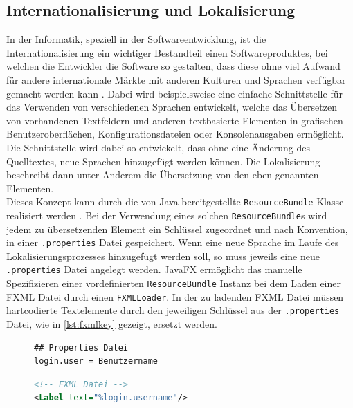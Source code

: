 \subsection{Internationalisierung und Lokalisierung}
In der Informatik, speziell in der Softwareentwicklung, ist die Internationalisierung ein wichtiger Bestandteil einen Softwareproduktes, bei welchen die Entwickler die Software so gestalten, dass diese ohne viel Aufwand für andere internationale Märkte mit anderen Kulturen und Sprachen verfügbar gemacht werden kann \cite{Reineke2005}. Dabei wird beispielsweise eine einfache Schnittstelle für das Verwenden von verschiedenen Sprachen entwickelt, welche das Übersetzen von vorhandenen Textfeldern und anderen textbasierte Elementen in grafischen Benutzeroberflächen, Konfigurationsdateien oder Konsolenausgaben ermöglicht. Die Schnittstelle wird dabei so entwickelt, dass ohne eine Änderung des Quelltextes, neue Sprachen hinzugefügt werden können. Die Lokalisierung beschreibt dann unter Anderem die Übersetzung von den eben genannten Elementen.\\
Dieses Konzept kann durch die von Java bereitgestellte \texttt{ResourceBundle} Klasse realisiert werden \cite{Deitsch2001}. Bei der Verwendung eines solchen \texttt{ResourceBundle}s wird jedem zu übersetzenden Element ein Schlüssel zugeordnet und nach Konvention, in einer \texttt{.properties} Datei gespeichert. Wenn eine neue Sprache im Laufe des Lokalisierungsprozesses hinzugefügt werden soll, so muss jeweils eine neue \texttt{.properties} Datei angelegt werden. JavaFX ermöglicht das manuelle Spezifizieren einer vordefinierten \texttt{ResourceBundle} Instanz bei dem Laden einer FXML Datei durch einen \texttt{FXMLLoader}.
In der zu ladenden FXML Datei müssen hartcodierte Textelemente durch den jeweiligen Schlüssel aus der \texttt{.properties} Datei, wie in \autoref{lst:fxmlkey} gezeigt, ersetzt werden.
\begin{figure}[H]
	\noindent
	\begin{adjustbox}{minipage=[t]{.45\linewidth},gstore totalheight=\heightone,margin=\fboxsep+\fboxrule}
		\begin{lstlisting}
## Properties Datei
login.user = Benutzername
		\end{lstlisting}
	\end{adjustbox}\hfill
	\begin{adjustbox}{minipage=[t][\heightone]{0.5\linewidth}}
		\begin{lstlisting}[language=XML]
<!-- FXML Datei -->
<Label text="%login.username"/>
		\end{lstlisting}
	\end{adjustbox}
	\label{lst:fxmlkey}
\end{figure}
